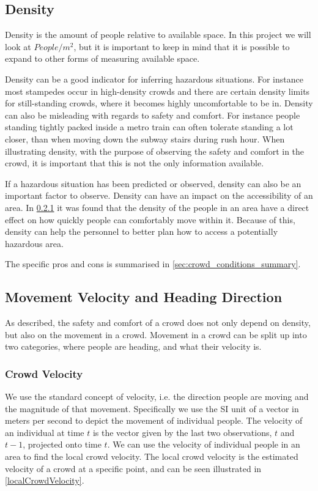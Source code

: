 \subsection{Density}
Density is the amount of people relative to available space. In this project we will look at $People / m^2$, but it is important to keep in mind that it is possible to expand to other forms of measuring available space.

Density can be a good indicator for inferring hazardous situations. For instance most stampedes occur in high-density crowds  and there are certain density limits for still-standing crowds, where it becomes highly uncomfortable to be in. 
Density can also be misleading with regards to safety and comfort. For instance people standing tightly packed inside a metro train can often tolerate standing a lot closer, than when moving down the subway stairs during rush hour. When illustrating density, with the purpose of observing the safety and comfort in the crowd, it is important that this is not the only information available.

If a hazardous situation has been predicted or observed, density can also be an important factor to observe. Density can have an impact on the accessibility of an area. In \cref{} it was found that the density of the people in an area have a direct effect on how quickly people can comfortably move within it. Because of this, density can help the personnel to better plan how to access a potentially hazardous area.

The specific pros and cons is summarised in \cref{sec:crowd_conditions_summary}.

\subsection{Movement Velocity and Heading Direction}
As described, the safety and comfort of a crowd does not only depend on density, but also on the movement in a crowd. Movement in a crowd can be split up into two categories, where people are heading, and what their velocity is.

\subsubsection{Crowd Velocity}
We use the standard concept of velocity, i.e. the direction people are moving and the magnitude of that movement. Specifically we use the SI unit of a vector in meters per second to depict the movement of individual people. The velocity of an individual at time $t$ is the vector given by the last two observations, $t$ and $t-1$, projected onto time $t$. We can use the velocity of individual people in an area to find the local crowd velocity. The local crowd velocity is the estimated velocity of a crowd at a specific point, and can be seen illustrated in \cref{localCrowdVelocity}.

